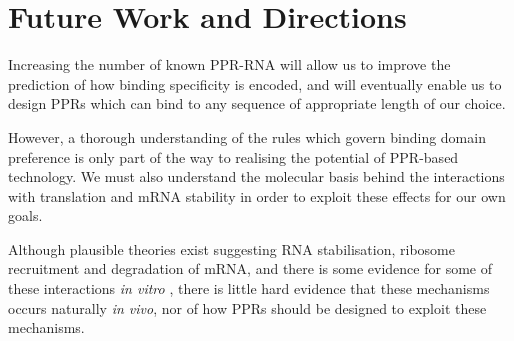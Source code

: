 \section{Future Work and Directions}

Increasing the number of known PPR-RNA will allow us to improve the prediction
of how binding specificity is encoded, and will eventually enable us to design
PPRs which can bind to any sequence of appropriate length of our choice.

However, a thorough understanding of the rules which govern binding domain 
preference is
only part of the way to realising the potential of PPR-based technology.
We must also understand the molecular basis behind the interactions with
translation and mRNA stability in order to exploit these effects for our own
goals.

Although plausible theories exist suggesting RNA stabilisation, ribosome 
recruitment and degradation of mRNA, and there is some evidence for some of 
these interactions
\emph{in vitro} \citep[see][]{Prikryl2011}, there is little hard evidence 
that these mechanisms occurs naturally \emph{in vivo}, nor of how PPRs should
be designed to exploit these mechanisms.

